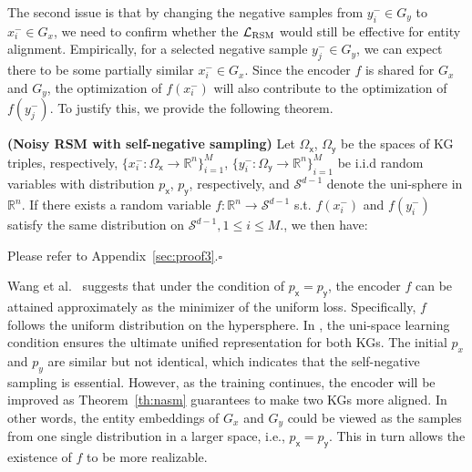The second issue is that by changing the negative samples from $y_i^-\in G_y$ to $x_i^-\in G_x$, we need to confirm whether the $\mathcal{L}_{\rm RSM}$ would still be effective for entity alignment. 
Empirically, for a selected negative sample $y_j^-\in {G_y}$, we can expect there to be some partially similar $x_i^-\in G_x$. 
Since the encoder $f$ is shared for ${G_x}$ and ${G_y}$, the optimization of $f(x_i^-)$ will also contribute to the optimization of $f(y_j^-)$. 
To justify this, we provide the following theorem. 

\begin{theorem}{\bf (Noisy RSM with self-negative sampling)}
Let $\Omega_{\mathsf x}$, $\Omega_{\mathsf y}$ be the spaces of KG triples, respectively,  ${\{x^-_i:\Omega_{\mathsf x}\to\mathbb{R}^n\}}_{i=1}^M$, ${\{y^-_i:\Omega_{\mathsf y}\to\mathbb{R}^n\}}_{i=1}^M$ be i.i.d random variables with distribution $p_{\mathsf x}$, $p_{\mathsf y}$, respectively, 
and $\mathcal{S}^{d-1}$ denote the uni-sphere in $\mathbb{R}^n$. 
If there exists a random variable  $f:\mathbb{R}^n\to\mathcal{S}^{d-1}$ s.t. $f(x_i^-)$ and $f(y_i^-)$ satisfy the same distribution on $\mathcal{S}^{d-1}, 1\le i\le M.$, we then have: 
\end{theorem}
\begin{pf}
Please refer to Appendix~\ref{sec:proof3}.\hfill$\square$
\end{pf}

Wang et al.~\cite{wang2020understanding} suggests that under the condition of $p_\mathsf{x}=p_\mathsf{y}$, the encoder $f$ can be attained approximately as the minimizer of the uniform loss.  
Specifically, $f$ follows the uniform distribution on the hypersphere. 
In \solution, the uni-space learning condition ensures the ultimate unified representation for both KGs. 
The initial $p_x$ and $p_y$ are similar but not identical, which indicates that the self-negative sampling is essential. 
However, as the training continues, the encoder will be improved as Theorem~\ref{th:nasm} guarantees to make two KGs more aligned. 
In other words, the entity embeddings of $G_x$ and $G_y$ could be viewed as the samples from one single distribution in a larger space, i.e., $p_\mathsf{x}=p_\mathsf{y}$. 
This in turn allows the existence of $f$ to be more realizable.

